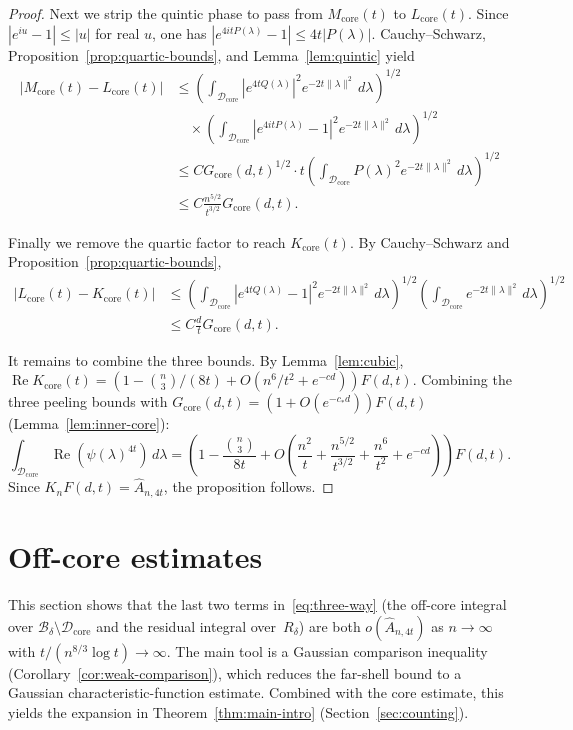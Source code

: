 \documentclass[11pt]{article}
\theoremstyle{definition}
\newcommand{\Bbox}{\mathcal{B}}
\newcommand{\corereg}{\mathcal{D}_\mathrm{core}}
\newcommand{\RePart}{\operatorname{Re}}
\newcommand{\core}{G_{\mathrm{core}}}
\newcommand{\Ahat}{\hat A_{n,4t}}
\begin{document}
\begin{proof}
Next we strip the quintic phase to pass from \(M_{\mathrm{core}}(t)\) to \(L_{\mathrm{core}}(t)\).
Since \(|e^{iu}-1|\le |u|\) for real \(u\), one has
\(|e^{4itP(\lambda)}-1|\le 4t|P(\lambda)|\).
Cauchy--Schwarz, Proposition~\ref{prop:quartic-bounds}, and Lemma~\ref{lem:quintic} yield
\begin{align*}
  |M_{\mathrm{core}}(t)-L_{\mathrm{core}}(t)|
  &\le
  \left(
    \int_{\corereg}|e^{4tQ(\lambda)}|^2e^{-2t\|\lambda\|^2}\,d\lambda
  \right)^{1/2}\\
  &\quad\times
  \left(
    \int_{\corereg}|e^{4itP(\lambda)}-1|^2e^{-2t\|\lambda\|^2}\,d\lambda
  \right)^{1/2}\\
  &\le
  C\core(d,t)^{1/2}\cdot
  t\left(
    \int_{\corereg}P(\lambda)^2e^{-2t\|\lambda\|^2}\,d\lambda
  \right)^{1/2}\\
  &\le C\frac{n^{5/2}}{t^{3/2}}\core(d,t).
\end{align*}

Finally we remove the quartic factor to reach \(K_{\mathrm{core}}(t)\).
By Cauchy--Schwarz and Proposition~\ref{prop:quartic-bounds},
\begin{align*}
  |L_{\mathrm{core}}(t)-K_{\mathrm{core}}(t)|
  &\le
  \left(
    \int_{\corereg}|e^{4tQ(\lambda)}-1|^2e^{-2t\|\lambda\|^2}\,d\lambda
  \right)^{1/2}
  \left(
    \int_{\corereg}e^{-2t\|\lambda\|^2}\,d\lambda
  \right)^{1/2}\\
  &\le C\frac{d}{t}\core(d,t).
\end{align*}

It remains to combine the three bounds. By Lemma~\ref{lem:cubic},
\(\RePart K_{\mathrm{core}}(t)=(1-\binom{n}{3}/(8t)+O(n^6/t^2+e^{-cd}))F(d,t)\).
Combining the three peeling bounds with \(\core(d,t)=(1+O(e^{-c_*d}))F(d,t)\) (Lemma~\ref{lem:inner-core}):
\[
  \int_{\corereg}\RePart(\psi(\lambda)^{4t})\,d\lambda
  =\left(1-\frac{\binom{n}{3}}{8t}+O\!\left(
    \frac{n^2}{t}
    +\frac{n^{5/2}}{t^{3/2}}
    +\frac{n^6}{t^2}
    +e^{-cd}
  \right)\right)F(d,t).
\]
Since \(K_nF(d,t)=\Ahat\), the proposition follows.
\end{proof}

\section{Off-core estimates}\label{sec:residual}

This section shows that the last two terms in~\eqref{eq:three-way} (the off-core integral over \(\Bbox_\delta\setminus\corereg\) and the residual integral over~\(R_\delta\)) are both \(o(\Ahat)\) as \(n\to\infty\) with \(t/(n^{8/3}\log t)\to\infty\). The main tool is a Gaussian comparison inequality (Corollary~\ref{cor:weak-comparison}), which reduces the far-shell bound to a Gaussian characteristic-function estimate. Combined with the core estimate, this yields the expansion in Theorem~\ref{thm:main-intro} (Section~\ref{sec:counting}).
\end{document}
